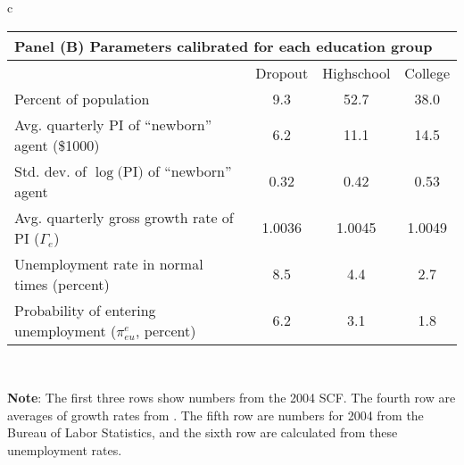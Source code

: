 \documentclass[\econtexRoot/HAFiscal]{subfiles}
\begin{document}
{\begin{table}[p]
\begin{tabular}{c}
        \begin{tabular}{lccc}
          \toprule 
          \multicolumn{4}{l}{Panel (B) Parameters calibrated for each education group} \\ \midrule
          & Dropout & Highschool & College \\ \midrule
          Percent of population & \phantom{0}9.3 & 52.7 & 38.0 \\ 
          Avg. quarterly PI of ``newborn'' agent (\$1000) & \phantom{0}6.2 & 11.1 & 14.5 \\
          Std. dev. of $\log($PI$)$ of ``newborn'' agent & 0.32 & 0.42 & 0.53 \\
          Avg. quarterly gross growth rate of PI ($\Gamma_e$) & 1.0036 & 1.0045 & 1.0049 \\
          Unemployment rate in normal times (percent) & \phantom{0}8.5 & \phantom{0}4.4 & \phantom{0}2.7 \\ 
          Probability of entering unemployment ($\pi_{eu}^{e}$, percent) & \phantom{0}6.2 & \phantom{0}3.1 & \phantom{0}1.8 
          \\ \bottomrule 
        \end{tabular} \\
        \ifdefined\HCode
        \fi
        \parbox{16cm}{\footnotesize \vspace{.25cm} \textbf{Note}: The first three rows show numbers from the 2004 SCF.
The fourth row are averages of growth rates from \cite{carroll2020modeling}.
The fifth row are numbers for 2004 from the Bureau of Labor Statistics, and the sixth row are calculated from these unemployment rates.\normalsize}
        \\ \\


\end{tabular}
\end{table}}
\end{document}
